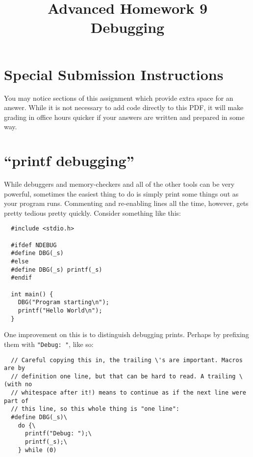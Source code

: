 \documentclass{article}
\begin{document}
\fancyfoot[C]{\color{gray} \thepage~/~\pageref*{LastPage}}
\pagestyle{fancyplain}

\title{\textbf{Advanced Homework 9\\Debugging}}
\author{\textbf{\color{red}{Due: Wednesday, November 14th, 11:59PM (Hard Deadline)}}}
\date{}
\maketitle

\section*{Special Submission Instructions}
You may notice sections of this assignment which provide extra space for an
answer. While it is not necessary to add code directly to this PDF, it will
make grading in office hours quicker if your answers are written and prepared
in some way.

\newpage


\section{``printf debugging''}

While debuggers and memory-checkers and all of the other tools can be very
powerful, sometimes the easiest thing to do is simply print some things out as
your program runs. Commenting and re-enabling lines all the time, however,
gets pretty tedious pretty quickly. Consider something like this:

\begin{lstlisting}
  #include <stdio.h>

  #ifdef NDEBUG
  #define DBG(_s)
  #else
  #define DBG(_s) printf(_s)
  #endif

  int main() {
    DBG("Program starting\n");
    printf("Hello World\n");
  }
\end{lstlisting}

One improvement on this is to distinguish debugging prints. Perhaps by
prefixing them with \texttt{"Debug: "}, like so:

\begin{lstlisting}
  // Careful copying this in, the trailing \'s are important. Macros are by
  // definition one line, but that can be hard to read. A trailing \ (with no
  // whitespace after it!) means to continue as if the next line were part of
  // this line, so this whole thing is "one line":
  #define DBG(_s)\
    do {\
      printf("Debug: ");\
      printf(_s);\
    } while (0)
\end{lstlisting}
\end{document}
